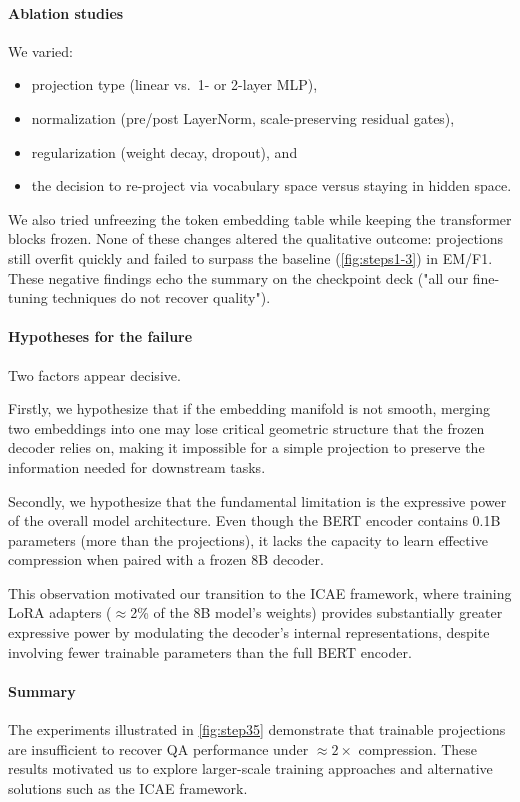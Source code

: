 \paragraph{Ablation studies}
We varied:
\begin{itemize}
    \item projection type (linear vs.\ 1- or 2-layer MLP),
    \item normalization (pre/post LayerNorm, scale-preserving residual gates),
    \item regularization (weight decay, dropout), and
    \item the decision to re-project via vocabulary space versus staying in hidden space.
\end{itemize}
We also tried unfreezing the token embedding table while keeping the transformer blocks frozen.
None of these changes altered the qualitative outcome: projections still overfit quickly and failed to surpass the baseline (\ref{fig:steps1-3}) in EM/F1.
These negative findings echo the summary on the checkpoint deck ("all our fine-tuning techniques do not recover quality").

\paragraph{Hypotheses for the failure}
Two factors appear decisive.

Firstly, we hypothesize that if the embedding manifold is not smooth, merging two embeddings into one may lose critical geometric structure that the frozen decoder relies on, making it impossible for a simple projection to preserve the information needed for downstream tasks.


Secondly, we hypothesize that the fundamental limitation is the expressive power of the overall model architecture.
Even though the BERT encoder contains 0.1B parameters (more than the projections), it lacks the capacity to learn effective compression when paired with a frozen 8B decoder.

This observation motivated our transition to the ICAE framework, where training LoRA adapters ($\approx$2\% of the 8B model's weights) provides substantially greater expressive power by modulating the decoder's internal representations, despite involving fewer trainable parameters than the full BERT encoder.


\paragraph{Summary}
The experiments illustrated in \ref{fig:step35} demonstrate that trainable projections are insufficient to recover QA performance under $\approx2\times$ compression.
These results motivated us to explore larger-scale training approaches and alternative solutions such as the ICAE framework.



